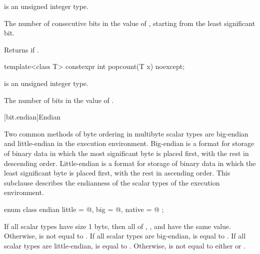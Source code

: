 %
\begin{itemdescr}
\pnum
\constraints
{} is an unsigned integer type.

\pnum
\returns
The number of consecutive  bits in the value of ,
starting from the least significant bit.
\begin{note}
Returns  if .
\end{note}
\end{itemdescr}

\begin{itemdecl}
template<class T>
  constexpr int popcount(T x) noexcept;
\end{itemdecl}

%
\begin{itemdescr}
\pnum
\constraints
{} is an unsigned integer type.

\pnum
\returns
The number of  bits in the value of .
\end{itemdescr}

[bit.endian]{Endian}

\pnum
Two common methods of byte ordering in multibyte scalar types are big-endian
and little-endian in the execution environment. Big-endian is a format for
storage of binary data in which the most significant byte is placed first,
with the rest in descending order. Little-endian is a format for storage of
binary data in which the least significant byte is placed first, with the rest
in ascending order. This subclause describes the endianness of the scalar types
of the execution environment.

%
%
%
%
\begin{itemdecl}
enum class endian {
  little = @\seebelow@,
  big    = @\seebelow@,
  native = @\seebelow@
};
\end{itemdecl}

\begin{itemdescr}
\pnum
If all scalar types have size 1 byte, then all of ,
, and  have the same value.
Otherwise,  is not equal to .
If all scalar types are big-endian,  is
equal to .
If all scalar types are little-endian,  is
equal to .
Otherwise,  is not equal
to either  or .
\end{itemdescr}

